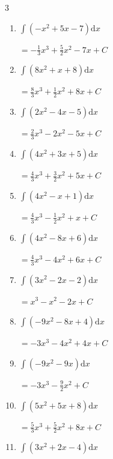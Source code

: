 \begin{multicols}{3}
\begin{enumerate}
  \item $\displaystyle \int \left( -x^{2}+5x-7 \right) \mathrm{d}x$

        $\displaystyle =-\frac{1}{3}x^{3}+\frac{5}{2}x^{2}-7x+ C$

  \item $\displaystyle \int \left( 8x^{2}+x+8 \right) \mathrm{d}x$

        $\displaystyle =\frac{8}{3}x^{3}+\frac{1}{2}x^{2}+8x+ C$

  \item $\displaystyle \int \left( 2x^{2}-4x-5 \right) \mathrm{d}x$

        $\displaystyle =\frac{2}{3}x^{3}-2x^{2}-5x+ C$

  \item $\displaystyle \int \left( 4x^{2}+3x+5 \right) \mathrm{d}x$

        $\displaystyle =\frac{4}{3}x^{3}+\frac{3}{2}x^{2}+5x+ C$

\columnbreak %

  \item $\displaystyle \int \left( 4x^{2}-x+1 \right) \mathrm{d}x$

        $\displaystyle =\frac{4}{3}x^{3}-\frac{1}{2}x^{2}+x+ C$

  \item $\displaystyle \int \left( 4x^{2}-8x+6 \right) \mathrm{d}x$

        $\displaystyle =\frac{4}{3}x^{3}-4x^{2}+6x+ C$

  \item $\displaystyle \int \left( 3x^{2}-2x-2 \right) \mathrm{d}x$

        $\displaystyle =x^{3}-x^{2}-2x+ C$

  \item $\displaystyle \int \left( -9x^{2}-8x+4 \right) \mathrm{d}x$

        $\displaystyle =-3x^{3}-4x^{2}+4x+ C$

  \item $\displaystyle \int \left( -9x^{2}-9x \right) \mathrm{d}x$

        $\displaystyle =-3x^{3}-\frac{9}{2}x^{2}+ C$

  \item $\displaystyle \int \left( 5x^{2}+5x+8 \right) \mathrm{d}x$

        $\displaystyle =\frac{5}{3}x^{3}+\frac{5}{2}x^{2}+8x+ C$

  \item $\displaystyle \int \left( 3x^{2}+2x-4 \right) \mathrm{d}x$


\end{enumerate}
\end{multicols}
